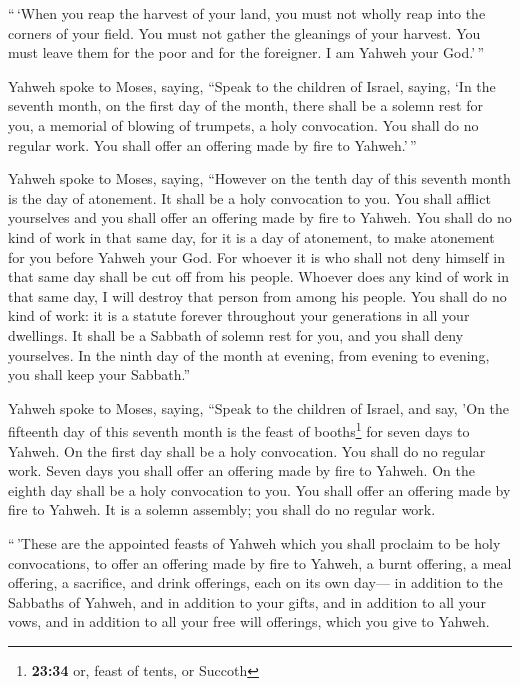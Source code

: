  ``\,`When you reap the harvest of your land, you must
not wholly reap into the corners of your field. You must not gather the
gleanings of your harvest. You must leave them for the poor and for the
foreigner. I am Yahweh your God.'\,''

 Yahweh spoke to Moses, saying,  ``Speak
to the children of Israel, saying, `In the seventh month, on the first
day of the month, there shall be a solemn rest for you, a memorial of
blowing of trumpets, a holy convocation.  You shall do no
regular work. You shall offer an offering made by fire to Yahweh.'\,''

 Yahweh spoke to Moses, saying,  ``However
on the tenth day of this seventh month is the day of atonement. It shall
be a holy convocation to you. You shall afflict yourselves and you shall
offer an offering made by fire to Yahweh.  You shall do
no kind of work in that same day, for it is a day of atonement, to make
atonement for you before Yahweh your God.  For whoever it
is who shall not deny himself in that same day shall be cut off from his
people.  Whoever does any kind of work in that same day,
I will destroy that person from among his people.  You
shall do no kind of work: it is a statute forever throughout your
generations in all your dwellings.  It shall be a Sabbath
of solemn rest for you, and you shall deny yourselves. In the ninth day
of the month at evening, from evening to evening, you shall keep your
Sabbath.''

 Yahweh spoke to Moses, saying,  ``Speak
to the children of Israel, and say, 'On the fifteenth day of this
seventh month is the feast of booths\footnote{\textbf{23:34} or, feast
  of tents, or Succoth} for seven days to Yahweh.  On the
first day shall be a holy convocation. You shall do no regular work.
 Seven days you shall offer an offering made by fire to
Yahweh. On the eighth day shall be a holy convocation to you. You shall
offer an offering made by fire to Yahweh. It is a solemn assembly; you
shall do no regular work.

 ``\,'These are the appointed feasts of Yahweh which you
shall proclaim to be holy convocations, to offer an offering made by
fire to Yahweh, a burnt offering, a meal offering, a sacrifice, and
drink offerings, each on its own day---  in addition to
the Sabbaths of Yahweh, and in addition to your gifts, and in addition
to all your vows, and in addition to all your free will offerings, which
you give to Yahweh.


